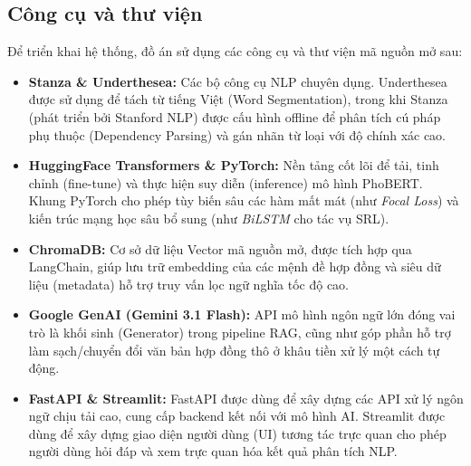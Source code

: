 \subsection{Công cụ và thư viện}
Để triển khai hệ thống, đồ án sử dụng các công cụ và thư viện mã nguồn mở sau:
\begin{itemize}
    \item \textbf{Stanza \& Underthesea:} Các bộ công cụ NLP chuyên dụng. Underthesea được sử dụng để tách từ tiếng Việt (Word Segmentation), trong khi Stanza (phát triển bởi Stanford NLP) được cấu hình offline để phân tích cú pháp phụ thuộc (Dependency Parsing) và gán nhãn từ loại với độ chính xác cao.
    \item \textbf{HuggingFace Transformers \& PyTorch:} Nền tảng cốt lõi để tải, tinh chỉnh (fine-tune) và thực hiện suy diễn (inference) mô hình PhoBERT. Khung PyTorch cho phép tùy biến sâu các hàm mất mát (như \textit{Focal Loss}) và kiến trúc mạng học sâu bổ sung (như \textit{BiLSTM} cho tác vụ SRL).
    \item \textbf{ChromaDB:} Cơ sở dữ liệu Vector mã nguồn mở, được tích hợp qua LangChain, giúp lưu trữ embedding của các mệnh đề hợp đồng và siêu dữ liệu (metadata) hỗ trợ truy vấn lọc ngữ nghĩa tốc độ cao.
    \item \textbf{Google GenAI (Gemini 3.1 Flash):} API mô hình ngôn ngữ lớn đóng vai trò là khối sinh (Generator) trong pipeline RAG, cũng như góp phần hỗ trợ làm sạch/chuyển đổi văn bản hợp đồng thô ở khâu tiền xử lý một cách tự động.
    \item \textbf{FastAPI \& Streamlit:} FastAPI được dùng để xây dựng các API xử lý ngôn ngữ chịu tải cao, cung cấp backend kết nối với mô hình AI. Streamlit được dùng để xây dựng giao diện người dùng (UI) tương tác trực quan cho phép người dùng hỏi đáp và xem trực quan hóa kết quả phân tích NLP.
\end{itemize}